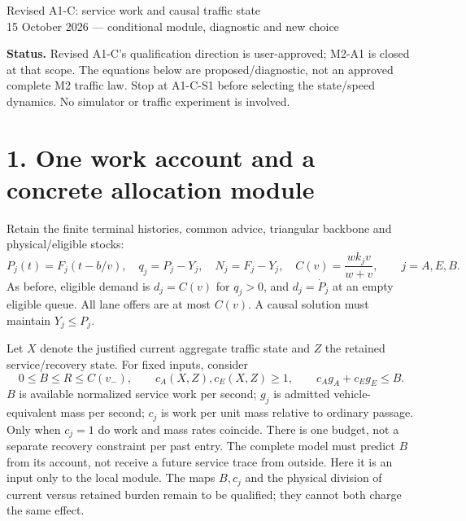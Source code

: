 \documentclass[11pt,a4paper]{article}
\begin{document}
\begin{center}
{\Large Revised A1-C: service work and causal traffic state}\\[4pt]
15 October 2026 --- conditional module, diagnostic and new choice
\end{center}

\textbf{Status.} Revised A1-C's qualification direction is user-approved;
M2-A1 is closed at that scope. The equations below are proposed/diagnostic,
not an approved complete M2 traffic law. Stop at A1-C-S1 before selecting
the state/speed dynamics. No simulator or traffic experiment is involved.

\section*{1. One work account and a concrete allocation module}

Retain the finite terminal histories, common advice, triangular backbone
and physical/eligible stocks:
\begin{equation}
 P_j(t)=F_j(t-b/v),\quad q_j=P_j-Y_j,\quad N_j=F_j-Y_j,\quad
 C(v)=\frac{wk_jv}{w+v},\qquad j=A,E,B. \tag{1}
\end{equation}
As before, eligible demand is $d_j=C(v)$ for $q_j>0$, and
$d_j=\dot P_j$ at an empty eligible queue. All lane offers are at most
$C(v)$. A causal solution must maintain $Y_j\leq P_j$.

Let $X$ denote the justified current aggregate traffic state and $Z$ the
retained service/recovery state. For fixed inputs, consider
\begin{equation}
 0\leq B\leq R\leq C(v_-),\qquad c_A(X,Z),c_E(X,Z)\geq1,
 \qquad c_Ag_A+c_Eg_E\leq B. \tag{2}
\end{equation}
$B$ is available normalized service work per second; $g_j$ is admitted
vehicle-equivalent mass per second; $c_j$ is work per unit mass relative
to ordinary passage. Only when $c_j=1$ do work and mass rates coincide.
There is one budget, not a separate recovery constraint per past entry.
The complete model must predict $B$ from its account, not receive a future
service trace from outside. Here it is an input only to the local module.
The maps $B,c_j$ and the physical division of current versus retained
burden remain to be qualified; they cannot both charge the same effect.
\end{document}
